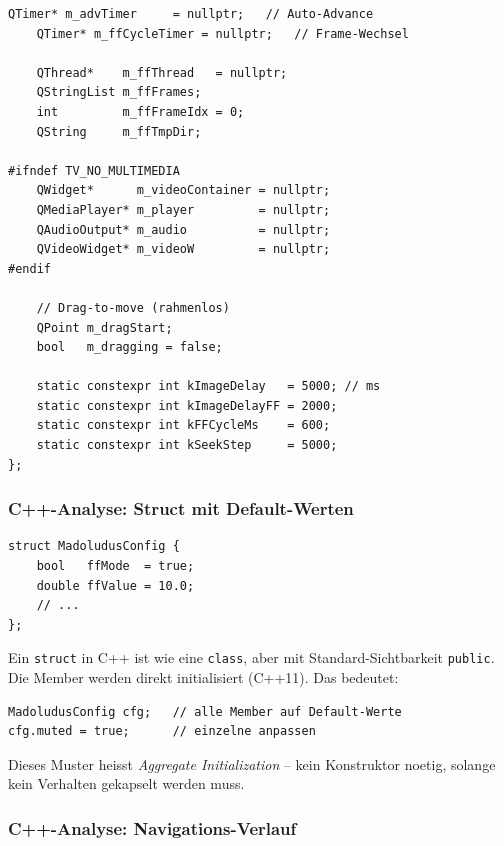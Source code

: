 \begin{lstlisting}[style=header,
  caption={madoluduswindow.h -- MadoludusConfig und Klassendeklaration}]
    QTimer* m_advTimer     = nullptr;   // Auto-Advance
    QTimer* m_ffCycleTimer = nullptr;   // Frame-Wechsel

    QThread*    m_ffThread   = nullptr;
    QStringList m_ffFrames;
    int         m_ffFrameIdx = 0;
    QString     m_ffTmpDir;

#ifndef TV_NO_MULTIMEDIA
    QWidget*      m_videoContainer = nullptr;
    QMediaPlayer* m_player         = nullptr;
    QAudioOutput* m_audio          = nullptr;
    QVideoWidget* m_videoW         = nullptr;
#endif

    // Drag-to-move (rahmenlos)
    QPoint m_dragStart;
    bool   m_dragging = false;

    static constexpr int kImageDelay   = 5000; // ms
    static constexpr int kImageDelayFF = 2000;
    static constexpr int kFFCycleMs    = 600;
    static constexpr int kSeekStep     = 5000;
};
\end{lstlisting}

\subsubsection{C++-Analyse: Struct mit Default-Werten}

\begin{lstlisting}
struct MadoludusConfig {
    bool   ffMode  = true;
    double ffValue = 10.0;
    // ...
};
\end{lstlisting}

Ein \verb|struct| in C++ ist wie eine \verb|class|, aber
mit Standard-Sichtbarkeit \verb|public|. Die Member
werden direkt initialisiert (C++11). Das bedeutet:
\begin{lstlisting}
MadoludusConfig cfg;   // alle Member auf Default-Werte
cfg.muted = true;      // einzelne anpassen
\end{lstlisting}
Dieses Muster heisst \emph{Aggregate Initialization} --
kein Konstruktor noetig, solange kein
Verhalten gekapselt werden muss.

\subsubsection{C++-Analyse: Navigations-Verlauf}

